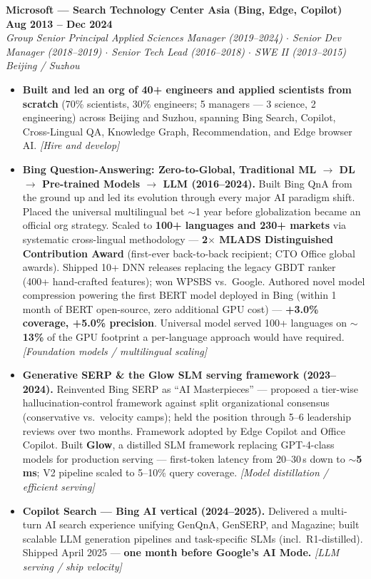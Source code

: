\documentclass[10.5pt,letterpaper]{article}
\newcommand{\role}[4]{%
  \noindent\textbf{#1} \hfill \textbf{#3}\\
  \textit{#2} \hfill \textit{#4}\par\vspace{2pt}}
\newcommand{\lp}[1]{\textcolor{blue!55!black}{\small\textit{[#1]}}}
\begin{document}
\vspace{4pt}
\role{Microsoft --- Search Technology Center Asia (Bing, Edge, Copilot)}{Group Senior Principal Applied Sciences Manager (2019--2024) $\cdot$ Senior Dev Manager (2018--2019) $\cdot$ Senior Tech Lead (2016--2018) $\cdot$ SWE II (2013--2015)}{Aug 2013 -- Dec 2024}{Beijing / Suzhou}
\begin{itemize}
  \item \textbf{Built and led an org of 40+ engineers and applied scientists from scratch} (70\% scientists, 30\% engineers; 5 managers --- 3 science, 2 engineering) across Beijing and Suzhou, spanning Bing Search, Copilot, Cross-Lingual QA, Knowledge Graph, Recommendation, and Edge browser AI. \lp{Hire and develop}
  \item \textbf{Bing Question-Answering: Zero-to-Global, Traditional ML $\to$ DL $\to$ Pre-trained Models $\to$ LLM (2016--2024).} Built Bing QnA from the ground up and led its evolution through every major AI paradigm shift. Placed the universal multilingual bet $\sim$1 year before globalization became an official org strategy. Scaled to \textbf{100+ languages and 230+ markets} via systematic cross-lingual methodology --- \textbf{2$\times$ MLADS Distinguished Contribution Award} (first-ever back-to-back recipient; CTO Office global awards). Shipped 10+ DNN releases replacing the legacy GBDT ranker (400+ hand-crafted features); won WPSBS vs.\ Google. Authored novel model compression powering the first BERT model deployed in Bing (within 1 month of BERT open-source, zero additional GPU cost) --- \textbf{+3.0\% coverage, +5.0\% precision}. Universal model served 100+ languages on \textbf{$\sim$13\%} of the GPU footprint a per-language approach would have required. \lp{Foundation models / multilingual scaling}
  \item \textbf{Generative SERP \& the Glow SLM serving framework (2023--2024).} Reinvented Bing SERP as ``AI Masterpieces'' --- proposed a tier-wise hallucination-control framework against split organizational consensus (conservative vs.\ velocity camps); held the position through 5--6 leadership reviews over two months. Framework adopted by Edge Copilot and Office Copilot. Built \textbf{Glow}, a distilled SLM framework replacing GPT-4-class models for production serving --- first-token latency from 20--30\,s down to \textbf{$\sim$5\,ms}; V2 pipeline scaled to 5--10\% query coverage. \lp{Model distillation / efficient serving}
  \item \textbf{Copilot Search --- Bing AI vertical (2024--2025).} Delivered a multi-turn AI search experience unifying GenQnA, GenSERP, and Magazine; built scalable LLM generation pipelines and task-specific SLMs (incl.\ R1-distilled). Shipped April 2025 --- \textbf{one month before Google's AI Mode.} \lp{LLM serving / ship velocity}

\end{itemize}
\end{document}
